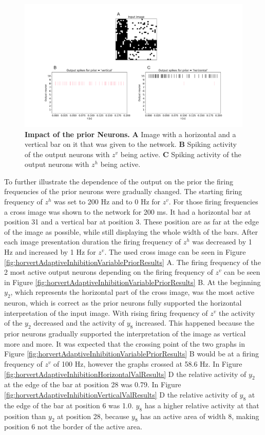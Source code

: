 \begin{figure}
  \includegraphics[width=\linewidth]{figures/horvertAdaptiveInh/20priors_pos5and12/crossValidation.png}
  \caption{\textbf{Impact of the prior Neurons.} \textbf{A} Image with a horizontal and a vertical bar on it that was given to the network. \textbf{B} Spiking activity of the output neurons with $z^v$ being active. \textbf{C} Spiking activity of the output neurons with $z^h$ being active. }
  \label{fig:horvertAdaptiveInhibitionPriorValResults}
\end{figure}

To further illustrate the dependence of the output on the prior the firing frequencies of the prior neurons were gradually changed. The starting firing frequency of $z^h$ was set to 200 Hz and to 0 Hz for $z^v$. For those firing frequencies a cross image was shown to the network for 200 ms. It had a horizontal bar at position 31 and a vertical bar at position 3. These position are as far at the edge of the image as possible, while still displaying the whole width of the bars. After each image presentation duration the firing frequency of $z^h$ was decreased by 1 Hz and increased by 1 Hz for $z^v$. The used cross image can be seen in Figure \ref{fig:horvertAdaptiveInhibitionVariablePriorResults} A. The firing frequency of the 2 most active output neurons depending on the firing frequency of $z^v$ can be seen in Figure \ref{fig:horvertAdaptiveInhibitionVariablePriorResults} B. At the beginning $y_2$, which represents the horizontal part of the cross image, was the most active neuron, which is correct as the prior neurons fully supported the horizontal interpretation of the input image. With rising firing frequency of $z^v$ the activity of the $y_2$ decreased and the activity of $y_8$ increased. This happened because the prior neurons gradually supported the interpretation of the image as vertical more and more. It was expected that the crossing point of the two graphs in Figure \ref{fig:horvertAdaptiveInhibitionVariablePriorResults} B would be at a firing frequency of $z^v$ of 100 Hz, however the graphs crossed at 58.6 Hz. In Figure \ref{fig:horvertAdaptiveInhibitionHorizontalValResults} D the relative activity of $y_2$ at the edge of the bar at position 28 was 0.79. In Figure \ref{fig:horvertAdaptiveInhibitionVerticalValResults} D the relative activity of $y_8$ at the edge of the bar at position 6 was 1.0. $y_8$ has a higher relative activity at that position than $y_2$ at position 28, because $y_8$ has an  active area of width 8, making position 6 not the border of the active area. 

